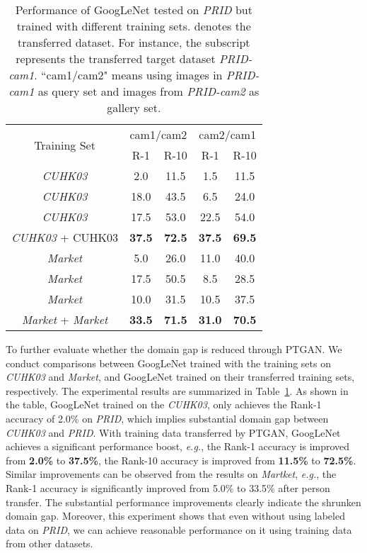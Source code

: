 \documentclass[10pt,twocolumn,letterpaper]{article}
\begin{document}
\captionsetup{belowskip=-0cm}
\captionsetup{aboveskip=0.1cm}
\begin{table}

\footnotesize
\begin{center}
\caption{Performance of GoogLeNet tested on \emph{PRID} but trained with different training sets.  denotes the transferred dataset. For instance, the subscript  represents the transferred target dataset \emph{PRID-cam1}. ``cam1/cam2" means using images in \emph{PRID-cam1} as query set and images from \emph{PRID-cam2} as gallery set. }\label{tab:tab2}
\begin{tabular}{c|c|c|c|c}
\hline
\multirow{2}{*}{Training Set}       &\multicolumn{2}{c|}{cam1/cam2}&\multicolumn{2}{c}{cam2/cam1} \\

 \cline{2-5} &R-1&R-10        &R-1&R-10\\

\hline
\hline

\emph{CUHK03}     &2.0&11.5 &1.5&11.5\\
\emph{CUHK03}       &18.0&43.5 &6.5&24.0\\
\emph{CUHK03}        &17.5&53.0 &22.5&54.0\\
\emph{CUHK03}  +  CUHK03       &\textbf{37.5}&\textbf{72.5} &\textbf{37.5}&\textbf{69.5}\\
\hline

\emph{Market}     &5.0&26.0 &11.0&40.0\\
\emph{Market}        &17.5&50.5 &8.5&28.5\\
\emph{Market}       &10.0&31.5 &10.5&37.5\\
\emph{Market}  +  \emph{Market}       &\textbf{33.5}&\textbf{71.5} &\textbf{31.0}&\textbf{70.5}\\
\hline
\end{tabular}
\end{center}
\end{table}

To further evaluate whether the domain gap is reduced through PTGAN. We conduct comparisons between GoogLeNet trained with the training sets on \emph{CUHK03} and \emph{Market}, and GoogLeNet trained on their transferred training sets, respectively. The experimental results are summarized in Table~\ref{tab:tab2}. As shown in the table, GoogLeNet trained on the \emph{CUHK03}, only achieves the Rank-1 accuracy of 2.0\% on \emph{PRID}, which implies substantial domain gap between \emph{CUHK03} and \emph{PRID}. With training data transferred by PTGAN, GoogLeNet achieves a significant performance boost, \emph{e.g.}, the Rank-1 accuracy is improved from \textbf{2.0\%} to \textbf{37.5\%}, the Rank-10 accuracy is improved from \textbf{11.5\%} to \textbf{72.5\%}. Similar improvements can be observed from the results on \emph{Martket}, \emph{e.g.}, the Rank-1 accuracy is significantly improved from 5.0\% to 33.5\% after person transfer. The substantial performance improvements clearly indicate the shrunken domain gap. Moreover, this experiment shows that even without using labeled data on \emph{PRID}, we can achieve reasonable performance on it using training data from other datasets.
\end{document}
